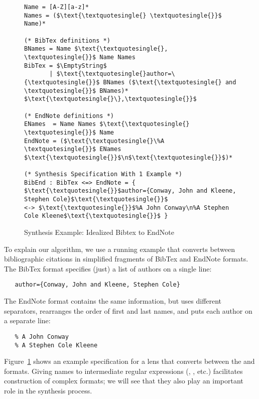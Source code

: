 \documentclass[numbers,10pt,preprint\ifanon ,nocopyrightspace\fi]{sigplanconf}
\begin{document}
\begin{figure}
\begin{lstlisting}[mathescape=true,columns=fixed]
Name = [A-Z][a-z]*
Names = ($\text{\textquotesingle{} \textquotesingle{}}$ Name)*

(* BibTex definitions *)
BNames = Name $\text{\textquotesingle{}, \textquotesingle{}}$ Name Names
BibTex = $\EmptyString$
       | $\text{\textquotesingle{}author=\{\textquotesingle{}}$ BNames ($\text{\textquotesingle{} and \textquotesingle{}}$ BNames)* $\text{\textquotesingle{}\},\textquotesingle{}}$

(* EndNote definitions *)
ENames  = Name Names $\text{\textquotesingle{} \textquotesingle{}}$ Name
EndNote = ($\text{\textquotesingle{}\%A \textquotesingle{}}$ ENames $\text{\textquotesingle{}}$\n$\text{\textquotesingle{}}$)*

(* Synthesis Specification With 1 Example *)
BibEnd : BibTex <=> EndNote = {
$\text{\textquotesingle{}}$author={Conway, John and Kleene, Stephen Cole}$\text{\textquotesingle{}}$
<-> $\text{\textquotesingle{}}$%A John Conway\n%A Stephen Cole Kleene$\text{\textquotesingle{}}$ }
\end{lstlisting}
  \caption{Synthesis Example: Idealized Bibtex to EndNote}
  \label{fig:bibend-spec}
\end{figure}

To explain our algorithm, we use a running example that converts between
bibliographic citations in simplified fragments of BibTex and EndNote
formats.  The BibTex format specifies (just) a list of authors on a single line:
\begin{lstlisting}
   author={Conway, John and Kleene, Stephen Cole}
\end{lstlisting}
The EndNote format contains the same information, but uses different separators,
rearranges the order of first and last names, and puts each author on
a separate line:
\begin{lstlisting}
   % A John Conway
   % A Stephen Cole Kleene
\end{lstlisting}
Figure~\ref{fig:bibend-spec} shows an example specification for a lens
 that converts between the  and  formats.
Giving names to intermediate regular expressions (, ,
etc.) facilitates construction of complex formats; we will see that they
also play an important role in the synthesis process.
\end{document}
